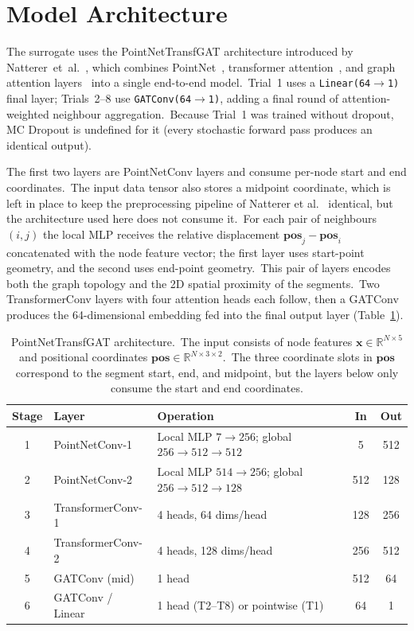 \section{Model Architecture}\label{sec:architecture}

The surrogate uses the PointNetTransfGAT architecture introduced by Natterer~et~al.~\cite{natterer2025ml}, which combines PointNet~\cite{qi2017pointnet}, transformer attention~\cite{shi2021masked}, and graph attention layers~\cite{velickovic2018graph} into a single end-to-end model.\ Trial~1 uses a \texttt{Linear(64$\to$1)} final layer; Trials~2--8 use \texttt{GATConv(64$\to$1)}, adding a final round of attention-weighted neighbour aggregation.\ Because Trial~1 was trained without dropout, MC Dropout is undefined for it (every stochastic forward pass produces an identical output).

The first two layers are PointNetConv layers and consume per-node start and end coordinates.\ The input data tensor also stores a midpoint coordinate, which is left in place to keep the preprocessing pipeline of Natterer et al.~\cite{natterer2025ml} identical, but the architecture used here does not consume it.\ For each pair of neighbours $(i,j)$ the local MLP receives the relative displacement $\mathbf{pos}_j - \mathbf{pos}_i$ concatenated with the node feature vector; the first layer uses start-point geometry, and the second uses end-point geometry.\ This pair of layers encodes both the graph topology and the 2D spatial proximity of the segments.\ Two TransformerConv layers with four attention heads each follow, then a GATConv produces the 64-dimensional embedding fed into the final output layer (Table~\ref{tab:architecture}).

\begin{table}[htbp]
 \centering
 \caption[PointNetTransfGAT layer-by-layer architecture]{PointNetTransfGAT architecture.\ The input consists of node features $\mathbf{x} \in \mathbb{R}^{N \times 5}$ and positional coordinates $\mathbf{pos} \in \mathbb{R}^{N \times 3 \times 2}$.\ The three coordinate slots in $\mathbf{pos}$ correspond to the segment start, end, and midpoint, but the layers below only consume the start and end coordinates.}
 \label{tab:architecture}
 \begin{tabular}{clp{4.7cm}cc}
 \toprule
 \textbf{Stage} & \textbf{Layer} & \textbf{Operation} & \textbf{In} & \textbf{Out} \\
 \midrule
 1 & PointNetConv-1 & Local MLP $7 \to 256$; global $256 \to 512 \to 512$ & 5 & 512 \\
 2 & PointNetConv-2 & Local MLP $514 \to 256$; global $256 \to 512 \to 128$ & 512 & 128 \\
 3 & TransformerConv-1 & 4 heads, 64 dims/head & 128 & 256 \\
 4 & TransformerConv-2 & 4 heads, 128 dims/head & 256 & 512 \\
 5 & GATConv (mid) & 1 head & 512 & 64 \\
 6 & GATConv / Linear & 1 head (T2--T8) or pointwise (T1) & 64 & 1 \\
 \bottomrule
 \end{tabular}
\end{table}

